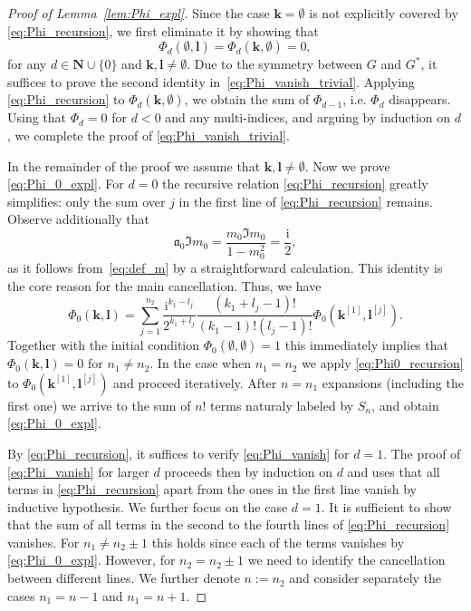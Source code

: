 \documentclass[10pt]{amsart}
\numberwithin{equation}{section}
\newcommand{\N}{\mathbf{N}}
\newcommand{\ma}{\mathfrak{a}}
\newcommand{\ii}{\mathrm{i}}
\begin{document}
\begin{proof}[Proof of Lemma~\ref{lem:Phi_expl}] Since the case $\bm{k}=\emptyset$ is not explicitly covered by \eqref{eq:Phi_recursion}, we first eliminate it by showing that
\begin{equation}
\Phi_d(\emptyset, \bm{l}) = \Phi_d(\bm{k},\emptyset)=0,
\label{eq:Phi_vanish_trivial}
\end{equation}
for any $d\in \N\cup\{0\}$ and $\bm{k},\bm{l}\neq \emptyset$. Due to the symmetry between $G$ and $G^*$, it suffices to prove the second identity in~\eqref{eq:Phi_vanish_trivial}. Applying \eqref{eq:Phi_recursion} to $\Phi_d(\bm{k},\emptyset)$, we obtain the sum of $\Phi_{d-1}$, i.e. $\Phi_d$ disappears. Using that $\Phi_d=0$ for $d<0$ and any multi-indices, and arguing by induction on $d$, we complete the proof of \eqref{eq:Phi_vanish_trivial}. 

In the remainder of the proof we assume that $\bm{k},\bm{l}\neq \emptyset$. Now we prove \eqref{eq:Phi_0_expl}. For $d=0$ the recursive relation \eqref{eq:Phi_recursion} greatly simplifies: only the sum over $j$ in the first line of \eqref{eq:Phi_recursion} remains. Observe additionally that
\begin{equation}
\ma_0 \Im m_0 = \frac{m_0\Im m_0}{1-m_0^2}=\frac{\ii}{2},
\label{eq:a_id}
\end{equation}
as it follows from~\eqref{eq:def_m} by a straightforward calculation. This identity is the core reason for the main cancellation. Thus, we have
\begin{equation}
\Phi_0(\bm{k},\bm{l})=\sum_{j=1}^{n_2} \frac{\ii^{k_1-l_j}}{2^{k_1+l_j}} \frac{(k_1+l_j-1)!}{(k_1-1)!(l_j-1)!}  \Phi_0\left(\bm{k}^{[1]},\bm{l}^{[j]}\right).
\label{eq:Phi0_recursion}
\end{equation}
Together with the initial condition  $\Phi_0(\emptyset,\emptyset)=1$ this immediately implies that $\Phi_0(\bm{k},\bm{l})=0$ for $n_1\neq n_2$. In the case when $n_1=n_2$ we apply \eqref{eq:Phi0_recursion} to $\Phi_0\left(\bm{k}^{[1]},\bm{l}^{[j]}\right)$ and proceed iteratively. After $n=n_1$ expansions (including the first one) we arrive to the sum of $n!$ terms naturaly labeled by $S_n$, and obtain \eqref{eq:Phi_0_expl}.

By \eqref{eq:Phi_recursion}, it suffices to verify \eqref{eq:Phi_vanish} for $d=1$. The proof of \eqref{eq:Phi_vanish} for larger $d$ proceeds then by induction on $d$ and uses that all terms in \eqref{eq:Phi_recursion} apart from the ones in the first line vanish by inductive hypothesis. We further focus on the case $d=1$. It is sufficient to show that the sum of all terms in the second  to the fourth lines of \eqref{eq:Phi_recursion} vanishes. For $n_1\neq n_2\pm 1$ this holds since each of the terms vanishes by \eqref{eq:Phi_0_expl}. However, for $n_2=n_2\pm 1$ we need to identify the cancellation between different lines. We further denote $n:=n_2$ and consider separately the cases $n_1=n-1$ and $n_1=n+1$.


\end{proof}
\end{document}
